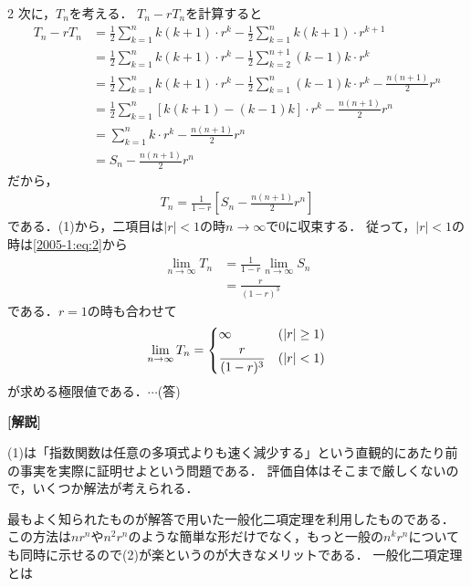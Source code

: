 \documentclass[../../main.tex]{subfiles}
\begin{document}
\begin{multicols}{2}
  \vspace{10pt}
  次に，$T_n$を考える．
  $T_n-rT_n$を計算すると
  \begin{align*}
    T_n -rT_n
     & = \frac{1}{2}\sum_{k=1}^n k(k+1) \cdot r^k - \frac{1}{2}\sum_{k=1}^n k(k+1) \cdot r^{k+1}                       \\
     & = \frac{1}{2}\sum_{k=1}^n k(k+1) \cdot r^k - \frac{1}{2}\sum_{k=2}^{n+1} (k-1)k \cdot r^{k}                     \\
     & = \frac{1}{2}\sum_{k=1}^n k(k+1) \cdot r^k - \frac{1}{2}\sum_{k=1}^{n} (k-1)k \cdot r^{k} - \frac{n(n+1)}{2}r^n \\
     & = \frac{1}{2}\sum_{k=1}^n \left[k(k+1)- (k-1)k \right] \cdot r^k - \frac{n(n+1)}{2}r^n                          \\
     & = \sum_{k=1}^n k \cdot r^k - \frac{n(n+1)}{2}r^n                                                                \\
     & = S_n - \frac{n(n+1)}{2}r^n
  \end{align*}
  だから，
  \begin{align*}
    T_n = \frac{1}{1-r}\left[ S_n - \frac{n(n+1)}{2}r^n  \right]
  \end{align*}
  である．(1)から，二項目は$|r|<1$の時$n\to\infty$で$0$に収束する．
  従って，$|r|<1$の時は\cref{2005-1:eq:2}から
  \begin{align*}
    \lim_{n\to\infty}T_n
     & = \frac{1}{1-r}\lim_{n\to\infty}S_n \\
     & = \frac{r}{(1-r)^3}
  \end{align*}
  である．$r=1$の時も合わせて
  \begin{align*}
    \lim_{n\to\infty}T_n =
    \begin{dcases}
      \infty            & (|r|\ge 1) \\
      \frac{r}{(1-r)^3} & (|r| < 1)
    \end{dcases}
  \end{align*}
  が求める極限値である．$\cdots$(答)

  \vspace{10pt}
  {\bf[解説]}

  (1)は「指数関数は任意の多項式よりも速く減少する」という直観的にあたり前の事実を実際に証明せよという問題である．
  評価自体はそこまで厳しくないので，いくつか解法が考えられる．

  最もよく知られたものが解答で用いた一般化二項定理を利用したものである．
  この方法は$nr^n$や$n^2r^n$のような簡単な形だけでなく，もっと一般の$n^{k}r^n$についても同時に示せるので(2)が楽というのが大きなメリットである．
  一般化二項定理とは



\end{multicols}
\end{document}
